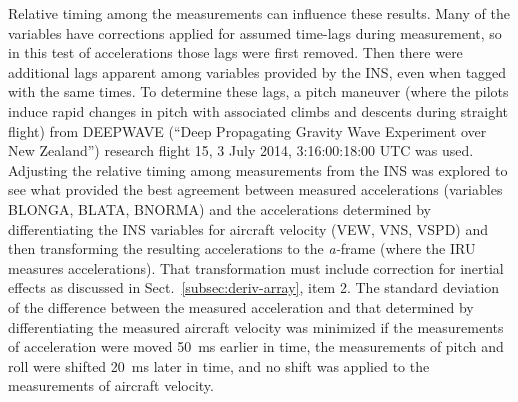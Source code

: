 \documentclass[12pt,twoside,english,12pt,twoside,english]{article}\usepackage[]{graphicx}\usepackage[]{color}
\let\OrgIndex\index
\renewcommand*{\index}[1]{\OrgIndex{#1}}
\begin{document}
Relative timing among the measurements
can influence these results. Many of the variables have corrections
applied for assumed time-lags during measurement, so in this test
of accelerations those lags were first removed. Then
there were additional lags apparent among variables provided by the
INS, even when tagged with the
same times. To determine these lags, a pitch maneuver
(where the pilots induce rapid changes in pitch with associated climbs
and descents during straight flight) from DEEPWAVE
(``Deep Propagating Gravity Wave Experiment over New Zealand'')
research flight 15, 3 July 2014, 3:16:00:18:00 UTC was
used. Adjusting the relative timing among measurements from the INS
was explored to see what provided the best agreement between measured
accelerations (variables BLONGA,
BLATA, BNORMA)
and the accelerations determined by differentiating the INS variables
for aircraft velocity (VEW,
VNS, VSPD)
and then transforming the resulting
accelerations to the \emph{a-}frame
(where the IRU measures
accelerations). That transformation must include correction for inertial
effects  as discussed in Sect.~\ref{subsec:deriv-array},
item 2. The standard deviation
of the difference between the measured acceleration and that determined
by differentiating the measured aircraft velocity was minimized if
the measurements of acceleration were moved 50~ms earlier in time,
the measurements of pitch and roll were shifted 20~ms later in time,
and no shift was applied to the measurements of aircraft velocity.
\end{document}
